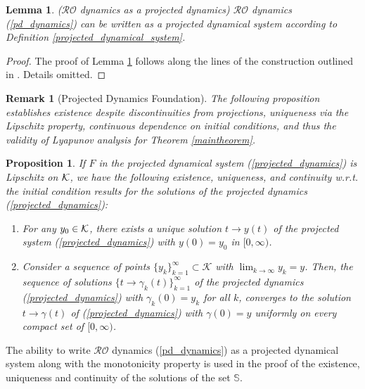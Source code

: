 \documentclass[journal,twoside,web]{ieeecolor}
\newcommand{\rev}[1]{\textcolor{revisionblue}{#1}}
\newtheorem{lemma}{Lemma}
\newtheorem{proposition}[theorem]{Proposition}
\newtheorem{remark}{Remark}
\begin{document}
\begin{lemma} \label{projected} ($\mathcal{RO}$ dynamics as a projected dynamics)
$\mathcal{RO}$ dynamics (\ref{pd_dynamics}) can be written as a projected dynamical system according to Definition \ref{projected_dynamical_system}.
\end{lemma}
\begin{proof}
The proof of Lemma \ref{projected} follows along the lines of the construction outlined in \cite{cherukuri2016}. Details omitted.
\end{proof}

\begin{remark}[\rev{Projected Dynamics Foundation}]
\rev{The following proposition establishes existence despite discontinuities from projections, uniqueness via the Lipschitz property, continuous dependence on initial conditions, and thus the validity of Lyapunov analysis for Theorem \ref{maintheorem}.}
\end{remark}

\begin{proposition} \label{proposition_projected}
If $F$ in the projected dynamical system (\ref{projected_dynamics}) is Lipschitz on ${\cal K}$, we have the following existence, uniqueness, and continuity w.r.t. the initial condition results for the solutions of the projected dynamics (\ref{projected_dynamics}):
\begin{enumerate}
\item For any $y_{0} \in {\cal K}$, there exists a unique solution $t \rightarrow y(t)$ of the projected system (\ref{projected_dynamics}) with $y(0)=y_{0}$ in $[0,\infty)$.
\item Consider a sequence of points $\{y_{k}\}_{k=1}^\infty \subset {\mathcal K}$ with $\lim_{k \rightarrow \infty} y_k=y$. Then, the sequence of solutions $\{t \rightarrow \gamma_k(t)\}_{k=1}^\infty$ of the projected dynamics (\ref{projected_dynamics}) with $\gamma_k(0)=y_k$ for all $k$, converges to the solution $t \rightarrow \gamma(t)$ of (\ref{projected_dynamics}) with $\gamma(0)=y$ uniformly on every compact set of $[0,\infty)$.
\end{enumerate}
\end{proposition}
The ability to write $\mathcal{RO}$ dynamics (\ref{pd_dynamics}) as a projected dynamical system along with the monotonicity property is used in the proof of the existence, uniqueness and continuity of the solutions of the set ${\mathbb S}$.
\end{document}
